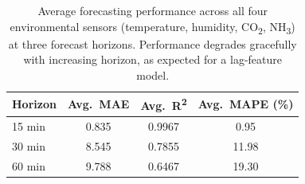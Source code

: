 \begin{table}[htbp]
  \centering
  \caption{Average forecasting performance across all four environmental sensors
           (temperature, humidity, CO\textsubscript{2}, NH\textsubscript{3})
           at three forecast horizons. Performance degrades gracefully with increasing
           horizon, as expected for a lag-feature model.}
  \label{tab:ai_forecasting_horizons}
  \begin{tabular}{lccc}
    \hline
    \textbf{Horizon} & \textbf{Avg.\ MAE} &
    \textbf{Avg.\ R\textsuperscript{2}} & \textbf{Avg.\ MAPE (\%)} \\
    \hline
  15 min & 0.835 & 0.9967 & 0.95 \\
  30 min & 8.545 & 0.7855 & 11.98 \\
  60 min & 9.788 & 0.6467 & 19.30 \\
    \hline
  \end{tabular}
\end{table}
